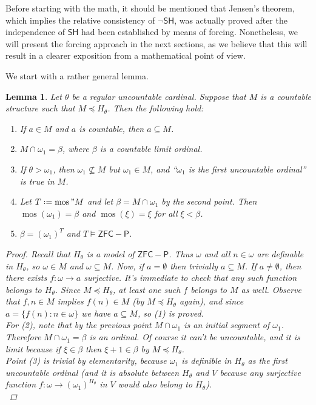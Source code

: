 \documentclass[11pt,a4paper]{report}
\newtheorem{lemma}[theorem]{Lemma}
\theoremstyle{definition}
\theoremstyle{num.custom-title}
\theoremstyle{custom-title}
\DeclareMathOperator{\sse}{\subseteq}
\DeclareMathOperator{\mos}{mos}
\newcommand{\SH}{\ensuremath{\mathsf{SH}}\xspace}
\newcommand{\nSH}{\ensuremath{\neg\mathsf{SH}}\xspace}
\newcommand*{\defeq}{\mathrel{\rlap{%
                     \raisebox{0.3ex}{$\cdot$}}%
                     \raisebox{-0.3ex}{$\cdot$}}%
                     =}
\begin{document}
Before starting with the math, it should be mentioned that Jensen's theorem, which implies the relative consistency of \nSH, was actually proved after the independence of \SH had been established by means of forcing. Nonetheless, we will present the forcing approach in the next sections, as we believe that this will result in a clearer exposition from a mathematical point of view.

We start with a rather general lemma.

\begin{lemma}\label{lemma-countable_elementary_substructure_of_H(theta)}
Let $\theta$ be a regular uncountable cardinal. Suppose that $M$ is a countable structure such that $M \preceq H_\theta$. Then the following hold:
\begin{enumerate}
\item If $a \in M$ and $a$ is countable, then $a \sse M$.
\item $M \cap \omega_1 = \beta$, where $\beta$ is a countable limit ordinal.
\item If $\theta > \omega_1$, then $\omega_1 \nsubseteq M$ but $\omega_1 \in M$, and ``$\omega_1$ is the first uncountable ordinal'' is true in $M$.
\item Let $T \defeq \mos"M$ and let $\beta = M \cap \omega_1$ by the second point. Then $\mos(\omega_1) = \beta$ and $\mos(\xi) = \xi$ for all $\xi < \beta$.
\item $\beta = (\omega_1)^T$ and $T \models \mathsf{ZFC-P}$.
\end{enumerate}
\begin{proof}
Recall that $H_\theta$ is a model of $\mathsf{ZFC-P}$. Thus $\omega$ and all $n \in \omega$ are definable in $H_\theta$, so $\omega \in M$ and $\omega \sse M$. Now, if $a=\emptyset$ then trivially $a \sse M$. If $a \neq \emptyset$, then there exists $f \colon \omega \to a$ surjective. It's immediate to check that any such function belongs to $H_\theta$. Since $M \preceq H_\theta$, at least one such $f$ belongs to $M$ as well. Observe that $f,n \in M$ implies $f(n) \in M$ (by $M \preceq H_\theta$ again), and since $a = \{f(n) : n \in \omega\}$ we have $a \sse M$, so (1) is proved.\\
For (2), note that by the previous point $M \cap \omega_1$ is an initial segment of $\omega_1$. Therefore $M \cap \omega_1 = \beta$ is an ordinal. Of course it can't be uncountable, and it is limit because if $\xi \in \beta$ then $\xi + 1 \in \beta$ by $M \preceq H_\theta$.\\
Point (3) is trivial by elementarity, because $\omega_1$ is definible in $H_\theta$ as the first uncountable ordinal (and it is absolute between $H_\theta$ and $V$ because any surjective function $f \colon \omega \to (\omega_1)^{H_\theta}$ in $V$ would also belong to $H_\theta$).\\

\end{proof}
\end{lemma}
\end{document}
